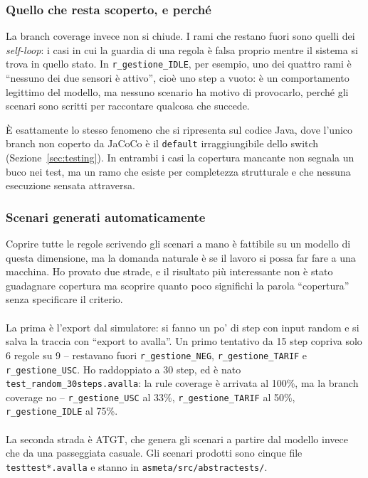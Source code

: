 \subsubsection{Quello che resta scoperto, e perché}

La branch coverage invece non si chiude. I rami che restano fuori sono quelli dei
\emph{self-loop}: i casi in cui la guardia di una regola è falsa proprio mentre il sistema
si trova in quello stato. In \texttt{r\_gestione\_IDLE}, per esempio, uno dei quattro rami
è ``nessuno dei due sensori è attivo'', cioè uno step a vuoto: è un comportamento
legittimo del modello, ma nessuno scenario ha motivo di provocarlo, perché gli scenari
sono scritti per raccontare qualcosa che succede.

È esattamente lo stesso fenomeno che si ripresenta sul codice Java, dove l'unico branch
non coperto da JaCoCo è il \texttt{default} irraggiungibile dello switch
(Sezione~\ref{sec:testing}). In entrambi i casi la copertura mancante non segnala un buco
nei test, ma un ramo che esiste per completezza strutturale e che nessuna esecuzione
sensata attraversa.


\subsubsection{Scenari generati automaticamente}\label{sec:generati}

Coprire tutte le regole scrivendo gli scenari a mano è fattibile su un modello di questa
dimensione, ma la domanda naturale è se il lavoro si possa far fare a una macchina. Ho
provato due strade, e il risultato più interessante non è stato guadagnare copertura ma
scoprire quanto poco significhi la parola ``copertura'' senza specificare il criterio.
\\ \\
La prima è l'export dal simulatore: si fanno un po' di step con input random e si salva
la traccia con ``export to avalla''. Un primo tentativo da 15 step copriva solo 6 regole
su 9 -- restavano fuori \texttt{r\_gestione\_NEG}, \texttt{r\_gestione\_TARIF} e
\texttt{r\_gestione\_USC}. Ho raddoppiato a 30 step, ed è nato
\texttt{test\_random\_30steps.avalla}: la rule coverage è arrivata al 100\%, ma la branch
coverage no -- \texttt{r\_gestione\_USC} al 33\%, \texttt{r\_gestione\_TARIF} al 50\%,
\texttt{r\_gestione\_IDLE} al 75\%.
\\ \\
La seconda strada è ATGT, che genera gli scenari a partire dal modello invece che da una
passeggiata casuale. Gli scenari prodotti sono cinque file \texttt{testtest*.avalla} e
stanno in \texttt{asmeta/src/abstractests/}.

